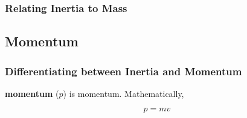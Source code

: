 \documentclass[dvipsnames]{article}
\begin{document}



\subsubsection{Relating Inertia to Mass}

\clearpage

\subsection{Momentum}

\subsubsection{Differentiating between Inertia and Momentum}

\textbf{\Gls{momentum}} ($p$) is \glsdesc{momentum}. Mathematically, 

\begin{equation*}
    p = mv
\end{equation*}
\end{document}
